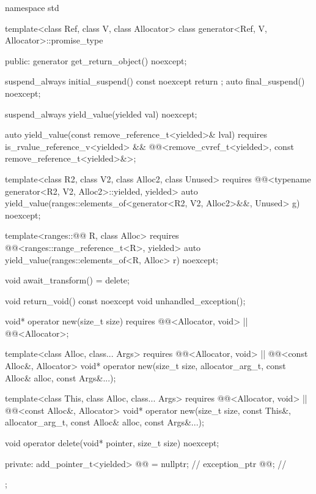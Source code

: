 \begin{codeblock}
namespace std {
  template<class Ref, class V, class Allocator>
  class generator<Ref, V, Allocator>::promise_type {
  public:
    generator get_return_object() noexcept;

    suspend_always initial_suspend() const noexcept { return {}; }
    auto final_suspend() noexcept;

    suspend_always yield_value(yielded val) noexcept;

    auto yield_value(const remove_reference_t<yielded>& lval)
      requires is_rvalue_reference_v<yielded> &&
        @@<remove_cvref_t<yielded>, const remove_reference_t<yielded>&>;

    template<class R2, class V2, class Alloc2, class Unused>
      requires @@<typename generator<R2, V2, Alloc2>::yielded, yielded>
        auto yield_value(ranges::elements_of<generator<R2, V2, Alloc2>&&, Unused> g) noexcept;

    template<ranges::@@ R, class Alloc>
      requires @@<ranges::range_reference_t<R>, yielded>
        auto yield_value(ranges::elements_of<R, Alloc> r) noexcept;

    void await_transform() = delete;

    void return_void() const noexcept {}
    void unhandled_exception();

    void* operator new(size_t size)
      requires @@<Allocator, void> || @@<Allocator>;

    template<class Alloc, class... Args>
      requires @@<Allocator, void> || @@<const Alloc&, Allocator>
        void* operator new(size_t size, allocator_arg_t, const Alloc& alloc, const Args&...);

    template<class This, class Alloc, class... Args>
      requires @@<Allocator, void> || @@<const Alloc&, Allocator>
        void* operator new(size_t size, const This&, allocator_arg_t, const Alloc& alloc,
                           const Args&...);

    void operator delete(void* pointer, size_t size) noexcept;

  private:
    add_pointer_t<yielded> @@ = nullptr;    // \expos
    exception_ptr @@;                      // \expos
  };
}
\end{codeblock}

